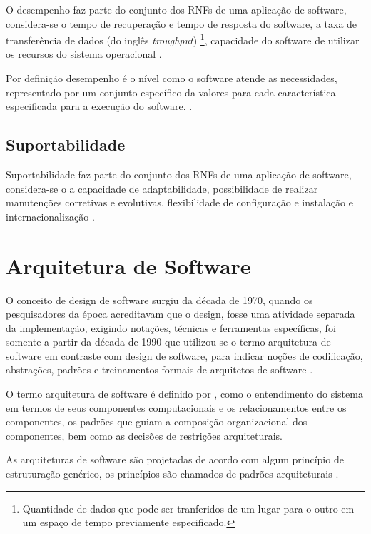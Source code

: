 O desempenho faz parte do conjunto dos RNFs de uma aplicação de software, considera-se o tempo de recuperação e tempo de resposta do software, a taxa de transferência de dados (do inglês \textit{troughput}) \footnote[1]{Quantidade de dados que pode ser tranferidos de um lugar para o outro em um espaço de tempo previamente especificado.}, capacidade do software de utilizar os recursos do sistema operacional \cite{cintra2006implementaccao}.

Por definição desempenho é o nível como o software atende as necessidades, representado por um conjunto específico da valores para cada característica especificada para a execução do software. \cite{qualidadeDeProdutoNBR}.  

\subsection{Suportabilidade}
\label{subsec:suportabilidade}

Suportabilidade faz parte do conjunto dos RNFs de uma aplicação de software, considera-se o a capacidade de adaptabilidade, possibilidade de realizar manutenções corretivas e evolutivas, flexibilidade de configuração e instalação e internacionalização \cite{cintra2006implementaccao}.

\section{Arquitetura de Software}
\label{sec:arquitetura}

O conceito de design de software surgiu da década de 1970, quando os pesquisadores da época acreditavam que o design, fosse uma atividade separada da implementação, exigindo notações, técnicas e ferramentas específicas, foi somente a partir da década de 1990 que utilizou-se o termo arquitetura de software em contraste com design de software, para indicar noções de codificação, abstrações, padrões e treinamentos formais de arquitetos de software \cite{perry1992foundations}.

O termo arquitetura de software é definido por \cite{shaw1996software}, como o entendimento do sistema em termos de seus componentes computacionais e os relacionamentos entre os componentes, os padrões que guiam a composição organizacional dos componentes, bem como as decisões de restrições arquiteturais. 

As arquiteturas de software são projetadas de acordo com algum princípio de estruturação genérico, os princípios são chamados de padrões arquiteturais \cite{buschmann1996system}. 

